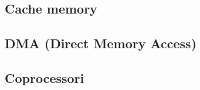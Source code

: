 \subsection[Cache memory]{Cache memory}
\subsection[DMA (Direct Memory Access)]{DMA (Direct Memory Access)}
\subsection[Coprocessori]{Coprocessori}





%	
%	


